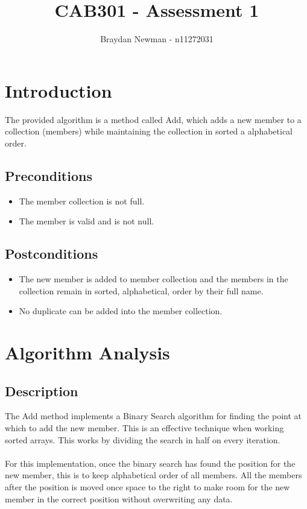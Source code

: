 \documentclass{article}
\begin{document}
\title{CAB301 - Assessment 1}
\author{Braydan Newman - n11272031}
\date{}
\maketitle

\pagebreak 

\tableofcontents{}

\pagebreak 

\section{Introduction}
The provided algorithm is a method called Add, which adds a new member to a collection (members) while maintaining the collection in sorted a alphabetical order. 

\subsection{Preconditions}
\begin{itemize}
\item The member collection is not full.
\item The member is valid and is not null.
 
\end{itemize}

\subsection{Postconditions}
\begin{itemize}
\item The new member is added to member collection and the members in the collection remain in sorted, alphabetical, order by their full name.
\item No duplicate can be added into the member collection.
 
\end{itemize}


\section{Algorithm Analysis}

\subsection{Description}
The Add method implements a Binary Search algorithm for finding the point at which to add the new member. This is an effective technique when working sorted arrays. This works by dividing the search in half on every iteration. 
\\\\
For this implementation, once the binary search has found the position for the new member, this is to keep alphabetical order of all members. All the members after the position is moved once space to the right to make room for the new member in the correct position without overwriting any data. 
\end{document}
